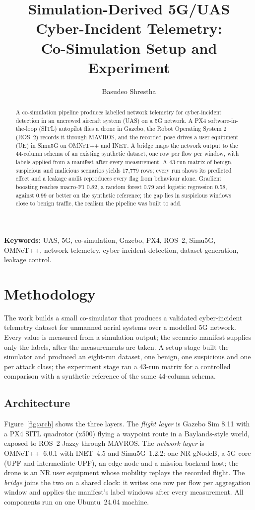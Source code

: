 \documentclass[10pt,twocolumn]{article}
\title{\vspace{-1.2em}Simulation-Derived 5G/UAS Cyber-Incident Telemetry:\\Co-Simulation Setup and Experiment\vspace{-0.3em}}
\author{Basudeo Shrestha}
\date{\vspace{-1.5em}}
\begin{document}
\maketitle

\begin{abstract}
\noindent A co-simulation pipeline produces labelled network telemetry for
cyber-incident detection in an uncrewed aircraft system (UAS) on a 5G
network. A PX4 software-in-the-loop (SITL) autopilot flies a drone in Gazebo,
the Robot Operating System 2 (ROS~2) records it through MAVROS, and the
recorded pose drives a user equipment (UE) in Simu5G on OMNeT++ and INET. A
bridge maps the network output to the 44-column schema of an existing
synthetic dataset, one row per flow per window, with labels applied from a
manifest after every measurement. A 43-run matrix of benign, suspicious and
malicious scenarios yields 17,779 rows; every run shows its predicted effect
and a leakage audit reproduces every flag from behaviour alone. Gradient
boosting reaches macro-F1 0.82, a random forest 0.79 and logistic regression
0.58, against 0.99 or better on the synthetic reference; the gap lies in
suspicious windows close to benign traffic, the realism the pipeline was
built to add.
\end{abstract}

\noindent\textbf{Keywords:} UAS, 5G, co-simulation, Gazebo, PX4, ROS~2,
Simu5G, OMNeT++, network telemetry, cyber-incident detection, dataset
generation, leakage control.

\section{Methodology}

The work builds a small co-simulator that produces a validated cyber-incident
telemetry dataset for unmanned aerial systems over a modelled 5G network.
Every value is measured from a simulation output; the scenario manifest
supplies only the labels, after the measurements are taken. A setup stage
built the simulator and produced an eight-run dataset, one benign, one
suspicious and one per attack class; the experiment stage ran a 43-run matrix
for a controlled comparison with a synthetic reference of the same 44-column
schema.

\subsection{Architecture}

Figure~\ref{fig:arch} shows the three layers. The \emph{flight layer} is
Gazebo Sim 8.11 with a PX4 SITL quadrotor (x500) flying a waypoint route in a
Baylands-style world, exposed to ROS~2 Jazzy through MAVROS. The
\emph{network layer} is OMNeT++~6.0.1 with INET~4.5 and Simu5G~1.2.2: one
NR gNodeB, a 5G core (UPF and intermediate UPF), an edge node and a mission
backend host; the drone is an NR user equipment whose mobility replays the
recorded flight. The \emph{bridge} joins the two on a shared clock: it
writes one row per flow per aggregation window and applies the manifest's
label windows after every measurement. All components run on one
Ubuntu~24.04 machine.
\end{document}
